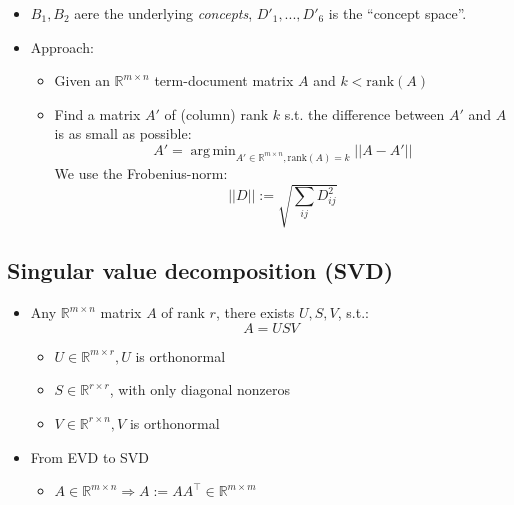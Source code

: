 \documentclass[a4paper]{scrartcl}
\DeclareMathOperator*{\argmin}{arg\,min}
\newcommand{\blu}[1]{\textcolor{mainblue}{#1}}
\begin{document}
\begin{itemize}
\begin{equation}
\begin{array}{cccccc}
        1&1&1&1&0&0 \\
        1&1&1&2&1&1 \\
        0&0&0&1&1&1
      \end{array}
    \right) = 
\underbrace{\left(
      \begin{array}{cc}
        1&0\\
        1&0\\
        1&1\\
        0&1\\
      \end{array}
    \right)}_{\mathrm{``concepts''}}\cdot
\underbrace{\left(
      \begin{array}{cccccc}
        1&1&1&1&0&0 \\
        0&0&0&1&1&1 
      \end{array}
    \right)}_{\mathrm{``concept\ space''}}
  \end{equation}
\item $B_1, B_2$ aere the underlying \blu{\emph{concepts}}, $D'_1,...,D'_6$ is
  the ``concept space''.
\item Approach:
  \begin{itemize}
  \item Given an $\mathbb{R}^{m\times n}$ term-document matrix $A$ and $k < \mathrm{rank}(A)$
  \item Find a matrix $A'$ of (column) rank $k$ s.t. the difference between $A'$
    and $A$ is as small as possible:
    \[A'=\argmin_{A'\in \mathbb{R}^{m\times n}, \mathrm{rank}(A)=k}||A-A'||\]
    We use the Frobenius-norm:
    \[||D||:=\sqrt{\sum_{ij}D_{ij}^2}\]
  \end{itemize}
\end{itemize}

\subsection{Singular value decomposition (SVD)}
\label{sec:svd}
\begin{itemize}
\item Any $\mathbb{R}^{m\times n}$ matrix $A$ of rank $r$, there exists $U,S,V$, s.t.:
  \[A=USV\]
  \begin{itemize}
  \item $U\in \mathbb{R}^{m\times r}, U$ is orthonormal
  \item $S \in \mathbb{R}^{r\times r}$, with only diagonal nonzeros
  \item $V\in \mathbb{R}^{r\times n}, V$ is orthonormal
  \end{itemize}
\item From EVD to SVD
  \begin{itemize}
  \item $A\in \mathbb{R}^{m\times n}\Rightarrow A:=AA^\top \in \mathbb{R}^{m\times m}$
  \end{itemize}
\end{itemize}
\end{document}
